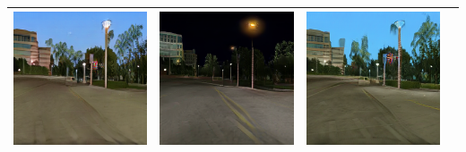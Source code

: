 \documentclass{VUMIFPSkursinis}
\begin{document}
\begin{table}[H]
{\begin{tabular}{|c|c|c|c|}
                \includegraphics[scale=0.35]{img/pvz/7_cycle_v2} & \includegraphics[scale=0.35]{img/pvz/7_cut_v2} & \includegraphics[scale=0.35]{img/pvz/7_mspc_v2}
                \\
                \hline
                \end{tabular}
            }
            \label{tab:table example}
        \end{table}
\end{document}
